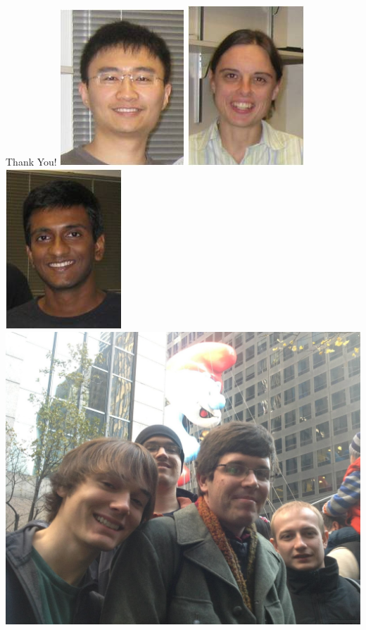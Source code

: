 \documentclass[12pt]{beamer}
\begin{document}
\begin{frame}{Thank You!}
\includegraphics[height=\picheight]{ping}
\hfill
\includegraphics[height=\picheight]{lilia}
\hfill
\includegraphics[height=\picheight]{karthik}
\hfill
\includegraphics[height=\picheight]{alexander_tom_dmitry}

\end{frame}
\end{document}
